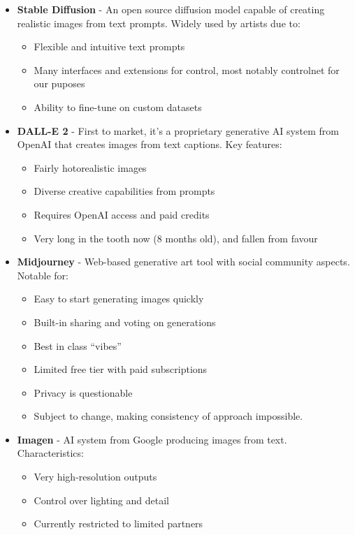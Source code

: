 \begin{itemize}
\item \textbf{Stable Diffusion} - An open source diffusion model capable of creating realistic images from text prompts. Widely used by artists due to:
\begin{itemize}
\item Flexible and intuitive text prompts
\item Many interfaces and extensions for control, most notably controlnet for our puposes
\item Ability to fine-tune on custom datasets
\end{itemize}

\item \textbf{DALL-E 2} - First to market, it's a proprietary generative AI system from OpenAI that creates images from text captions. Key features:
\begin{itemize}
\item Fairly hotorealistic images
\item Diverse creative capabilities from prompts
\item Requires OpenAI access and paid credits
\item Very long in the tooth now (8 months old), and fallen from favour\end{itemize}

\item \textbf{Midjourney} - Web-based generative art tool with social community aspects. Notable for:

\begin{itemize}
\item Easy to start generating images quickly
\item Built-in sharing and voting on generations
\item Best in class ``vibes''
\item Limited free tier with paid subscriptions
\item Privacy is questionable
\item Subject to change, making consistency of approach impossible.
\end{itemize}

\item \textbf{Imagen} - AI system from Google producing images from text. Characteristics:
\begin{itemize}
\item Very high-resolution outputs
\item Control over lighting and detail
\item Currently restricted to limited partners
\end{itemize}

\end{itemize}

